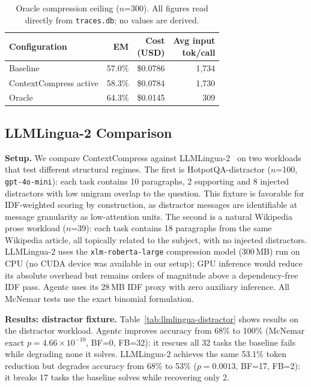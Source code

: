 \begin{table}[t]
\caption{Oracle compression ceiling ($n$=300). All figures read directly from
\texttt{traces.db}; no values are derived.}
\label{tab:oracle}
\small
\begin{tabularx}{\columnwidth}{@{} X r r r @{}}
\toprule
Configuration & EM & \makecell[r]{Cost\\(USD)} & \makecell[r]{Avg input\\tok/call} \\
\midrule
Baseline               & 57.0\% & \$0.0786 & 1,734 \\
ContextCompress active & 58.3\% & \$0.0784 & 1,730 \\
Oracle                 & 64.3\% & \$0.0145 &   309 \\
\bottomrule
\end{tabularx}
\end{table}

\subsection{LLMLingua-2 Comparison}
\label{sec:eval-llmlingua}

\textbf{Setup.} We compare ContextCompress against LLMLingua-2~\cite{pan2024llmlingua2}
on two workloads that test different structural regimes. The first is
HotpotQA-distractor ($n$=100, \texttt{gpt-4o-mini}): each task contains 10 paragraphs,
2 supporting and 8 injected distractors with low unigram overlap to the question.
This fixture is favorable for IDF-weighted scoring by construction, as distractor
messages are identifiable at message granularity as low-attention units. The second is
a natural Wikipedia prose workload ($n$=39): each task contains 18 paragraphs from the
same Wikipedia article, all topically related to the subject, with no injected
distractors. LLMLingua-2 uses the \texttt{xlm-roberta-large} compression model
(300\,MB) run on CPU (no CUDA device was available in our setup); GPU inference would
reduce its absolute overhead but remains orders of magnitude above a dependency-free
IDF pass. Agentc uses its 28\,MB IDF proxy with zero auxiliary inference. All
McNemar tests use the exact binomial formulation.

\textbf{Results: distractor fixture.} Table~\ref{tab:llmlingua-distractor} shows
results on the distractor workload. Agentc improves accuracy from 68\% to 100\%
(McNemar exact $p=4.66\times10^{-10}$, BF=0, FB=32): it rescues all 32 tasks the
baseline fails while degrading none it solves. LLMLingua-2 achieves the same 53.1\%
token reduction but degrades accuracy from 68\% to 53\% ($p=0.0013$, BF=17, FB=2):
it breaks 17 tasks the baseline solves while recovering only 2.


